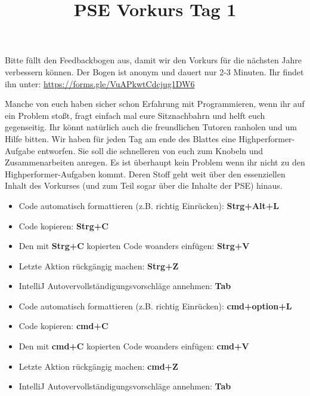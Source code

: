 \documentclass{../../sheet}
\title{PSE Vorkurs Tag 1}
\begin{document}
\maketitle

Bitte füllt den Feedbackbogen aus, damit wir den Vorkurs für die nächsten Jahre verbessern können. Der Bogen ist anonym und dauert nur 2-3 Minuten. \newline Ihr findet ihn unter: \url{https://forms.gle/VuAPkwtCdcjug1DW6}

Manche von euch haben sicher schon Erfahrung mit Programmieren, wenn ihr auf ein Problem stoßt, fragt einfach mal eure Sitznachbahrn und helft euch gegenseitig. Ihr könnt natürlich auch die freundlichen Tutoren ranholen und um Hilfe bitten.
Wir haben für jeden Tag am ende des Blattes eine Highperformer-Aufgabe entworfen. Sie soll die schnelleren von euch zum Knobeln und Zusammenarbeiten anregen. Es ist überhaupt kein Problem wenn ihr nicht zu den Highperformer-Aufgaben kommt. Deren Stoff geht weit über den essenziellen Inhalt des Vorkurses (und zum Teil sogar über die Inhalte der PSE) hinaus.


\begin{itemize}
  \item Code automatisch formattieren (z.B. richtig Einrücken): \textbf{Strg+Alt+L}
  \item Code kopieren: \textbf{Strg+C}
  \item Den mit \textbf{Strg+C} kopierten Code woanders einfügen: \textbf{Strg+V}
  \item Letzte Aktion rückgängig machen: \textbf{Strg+Z}
  \item IntelliJ Autovervollständigungsvorschläge annehmen: \textbf{Tab}
\end{itemize}

\begin{itemize}
  \item Code automatisch formattieren (z.B. richtig Einrücken): \textbf{cmd+option+L}
  \item Code kopieren: \textbf{cmd+C}
  \item Den mit \textbf{cmd+C} kopierten Code woanders einfügen: \textbf{cmd+V}
  \item Letzte Aktion rückgängig machen: \textbf{cmd+Z}
  \item IntelliJ Autovervollständigungsvorschläge annehmen: \textbf{Tab}
\end{itemize}
\end{document}
